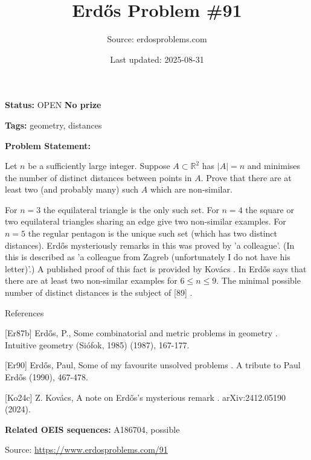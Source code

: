 \documentclass{article}
\title{Erd\H{o}s Problem \#91}
\date{Last updated: 2025-08-31}
\author{Source: erdosproblems.com}
\begin{document}
\maketitle

\noindent\textbf{Status:} OPEN \quad \textbf{No prize}

\noindent\textbf{Tags:} geometry, distances

\medskip

\noindent\textbf{Problem Statement:}

Let $n$ be a sufficiently large integer. Suppose $A\subset \mathbb{R}^2$ has $\lvert A\rvert=n$ and minimises the number of distinct distances between points in $A$. Prove that there are at least two (and probably many) such $A$ which are non-similar.




For $n=3$ the equilateral triangle is the only such set. For $n=4$ the square or two equilateral triangles sharing an edge give two non-similar examples. For $n=5$ the regular pentagon is the unique such set (which has two distinct distances). Erd\H{o}s mysteriously remarks in \cite{Er90} this was proved by 'a colleague'. (In \cite{Er87b} this is described as 'a colleague from Zagreb (unfortunately I do not have his letter)'.) A published proof of this fact is provided by Kov\'{a}cs \cite{Ko24c}. In \cite{Er87b} Erd\H{o}s says that there are at least two non-similar examples for $6\leq n\leq 9$. The minimal possible number of distinct distances is the subject of [89] .




References

[Er87b] Erd\H{o}s, P., Some combinatorial and metric problems in geometry . Intuitive geometry (Si\'{o}fok, 1985) (1987), 167-177.

[Er90] Erd\H{o}s, Paul, Some of my favourite unsolved problems . A tribute to Paul Erd\H{o}s (1990), 467-478.

[Ko24c] Z. Kov\'{a}cs, A note on Erd\H{o}s's mysterious remark . arXiv:2412.05190 (2024).

\noindent\textbf{Related OEIS sequences:} A186704, possible


\bigskip
\noindent\small{Source: \url{https://www.erdosproblems.com/91}}
\end{document}
